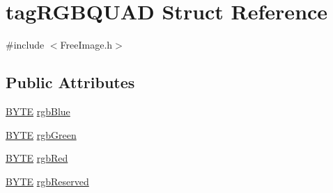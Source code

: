 \hypertarget{structtag_r_g_b_q_u_a_d}{\section{tag\-R\-G\-B\-Q\-U\-A\-D Struct Reference}
\label{structtag_r_g_b_q_u_a_d}
}


{\ttfamily \#include $<$Free\-Image.\-h$>$}

\subsection*{Public Attributes}
\begin{DoxyCompactItemize}
\item 
\hyperlink{_free_image_8h_aae9749d96e15ccb4f482dd5f55d98f9b}{B\-Y\-T\-E} \hyperlink{structtag_r_g_b_q_u_a_d_ad99c50770a73c6fae3ee1ea627da1c60}{rgb\-Blue}
\item 
\hyperlink{_free_image_8h_aae9749d96e15ccb4f482dd5f55d98f9b}{B\-Y\-T\-E} \hyperlink{structtag_r_g_b_q_u_a_d_a4dae0a7db2f4d432cb4da3de4ef337bd}{rgb\-Green}
\item 
\hyperlink{_free_image_8h_aae9749d96e15ccb4f482dd5f55d98f9b}{B\-Y\-T\-E} \hyperlink{structtag_r_g_b_q_u_a_d_aa143fcd3ff08a04b152bee9d410821a6}{rgb\-Red}
\item 
\hyperlink{_free_image_8h_aae9749d96e15ccb4f482dd5f55d98f9b}{B\-Y\-T\-E} \hyperlink{structtag_r_g_b_q_u_a_d_a2758aec56e37d4f3f5fde511a58f4f82}{rgb\-Reserved}
\end{DoxyCompactItemize}


